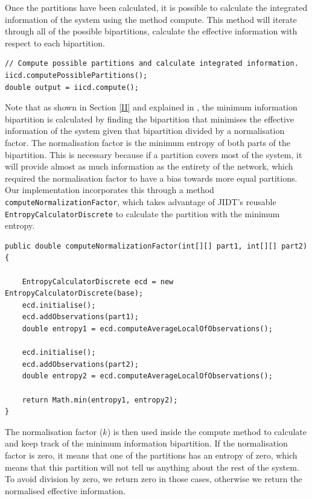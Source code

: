 \documentclass[a4paper,11pt]{article}
\begin{document}
Once the partitions have been calculated, it is possible to calculate the integrated information of the system using the method compute. This method will iterate through all of the possible bipartitions, calculate the effective information with respect to each bipartition.

\begin{verbatim}
// Compute possible partitions and calculate integrated information.
iicd.computePossiblePartitions();
double output = iicd.compute();
\end{verbatim}

Note that as shown in Section \ref{II} and explained in \cite{Barrett2011}, the minimum information bipartition is calculated by finding the bipartition that minimises the effective information of the system given that bipartition divided by a normalisation factor. The normalisation factor is the minimum entropy of both parts of the bipartition. This is necessary because if a partition covers most of the system, it will provide almost as much information as the entirety of the network, which required the normalisation factor to have a bias towards more equal partitions. Our implementation incorporates this through a method \texttt{computeNormalizationFactor}, which takes advantage of JIDT's reusable \texttt{EntropyCalculatorDiscrete} to calculate the partition with the minimum entropy.

\begin{verbatim}
public double computeNormalizationFactor(int[][] part1, int[][] part2) {

	EntropyCalculatorDiscrete ecd = new EntropyCalculatorDiscrete(base);
	ecd.initialise();
	ecd.addObservations(part1);
	double entropy1 = ecd.computeAverageLocalOfObservations();

	ecd.initialise();
	ecd.addObservations(part2);
	double entropy2 = ecd.computeAverageLocalOfObservations();

	return Math.min(entropy1, entropy2);
}
\end{verbatim}

The normalisation factor ($k$) is then used inside the compute method to calculate and keep track of the minimum information bipartition. If the normalisation factor is zero, it means that one of the partitions has an entropy of zero, which means that this partition will not tell us anything about the rest of the system. To avoid division by zero, we return zero in those cases, otherwise we return the normalised effective information.
\end{document}
